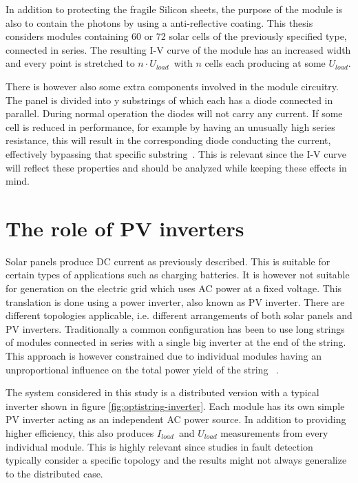 
In addition to protecting the fragile Silicon sheets, the purpose of the module is also to contain the photons by using a anti-reflective coating.
This thesis considers modules containing 60 or 72 solar cells of the previously specified type, connected in series.
The resulting I-V curve of the module has an increased width and every point is stretched to $n \cdot U_{load}$ with $n$ cells each producing at some $U_{load}$.

There is however also some extra components involved in the module circuitry.
The panel is divided into y substrings of which each has a diode connected in parallel.
During normal operation the diodes will not carry any current.
If some cell is reduced in performance, for example by having an unusually high series resistance, this will result in the corresponding diode conducting the current, effectively bypassing that specific substring~\cite{Roman2006}.
This is relevant since the I-V curve will reflect these properties and should be analyzed while keeping these effects in mind.

\section{The role of PV inverters}
Solar panels produce DC current as previously described.
This is suitable for certain types of applications such as charging batteries.
It is however not suitable for generation on the electric grid which uses AC power at a fixed voltage.
This translation is done using a power inverter, also known as PV inverter.
There are different topologies applicable, i.e. different arrangements of both solar panels and PV inverters.
Traditionally a common configuration has been to use long strings of modules connected in series with a single big inverter at the end of the string.
This approach is however constrained due to individual modules having an unproportional influence on the total power yield of the string ~\cite{Roman2006}.


The system considered in this study is a distributed version with a typical inverter shown in figure \ref{fig:optistring-inverter}.
Each module has its own simple PV inverter acting as an independent AC power source.
In addition to providing higher efficiency, this also produces $I_{load}$ and $U_{load}$ measurements from every individual module.
This is highly relevant since studies in fault detection typically consider a specific topology and the results might not always generalize to the distributed case.

